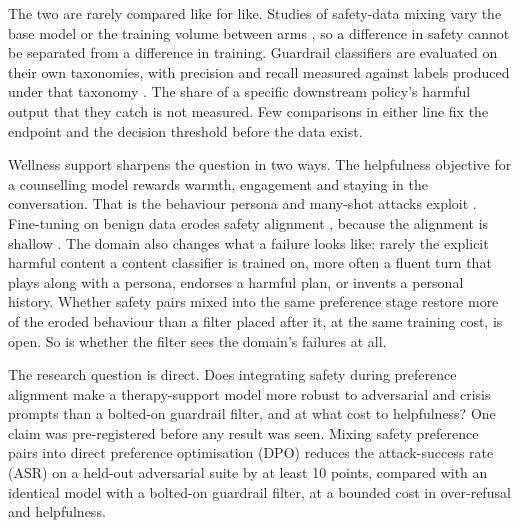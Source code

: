 \documentclass[10pt]{article} %
\begin{document}
The two are rarely compared like for like. Studies of safety-data mixing vary the base model or the training volume between arms \citep{bianchi2024safetytuned}, so a difference in safety cannot be separated from a difference in training. Guardrail classifiers are evaluated on their own taxonomies, with precision and recall measured against labels produced under that taxonomy \citep{inan2023llamaguard,zeng2024shieldgemma}. The share of a specific downstream policy's harmful output that they catch is not measured. Few comparisons in either line fix the endpoint and the decision threshold before the data exist.

Wellness support sharpens the question in two ways. The helpfulness objective for a counselling model rewards warmth, engagement and staying in the conversation. That is the behaviour persona and many-shot attacks exploit \citep{shah2023persona,anil2024manyshot}. Fine-tuning on benign data erodes safety alignment \citep{qi2024finetuning}, because the alignment is shallow \citep{qi2025safety,li2026superficial}. The domain also changes what a failure looks like: rarely the explicit harmful content a content classifier is trained on, more often a fluent turn that plays along with a persona, endorses a harmful plan, or invents a personal history. Whether safety pairs mixed into the same preference stage restore more of the eroded behaviour than a filter placed after it, at the same training cost, is open. So is whether the filter sees the domain's failures at all.

The research question is direct. Does integrating safety during preference alignment make a therapy-support model more robust to adversarial and crisis prompts than a bolted-on guardrail filter, and at what cost to helpfulness? One claim was pre-registered before any result was seen. Mixing safety preference pairs into direct preference optimisation (DPO) reduces the attack-success rate (ASR) on a held-out adversarial suite by at least 10 points, compared with an identical model with a bolted-on guardrail filter, at a bounded cost in over-refusal and helpfulness.
\end{document}
